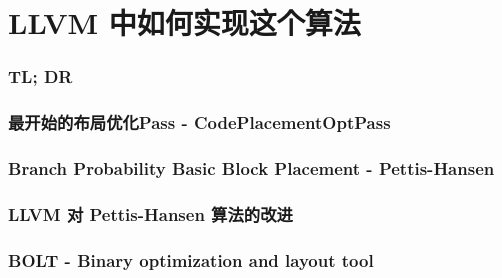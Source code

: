 \section{LLVM 中如何实现这个算法}


\begin{frame}
    \frametitle{TL; DR}
    
\end{frame}

\begin{frame}
    \frametitle{最开始的布局优化Pass - CodePlacementOptPass}
    
\end{frame}


\begin{frame}
    \frametitle{Branch Probability Basic Block Placement - Pettis-Hansen}
    
\end{frame}

\begin{frame}
    \frametitle{LLVM 对 Pettis-Hansen 算法的改进}
    
\end{frame}

\begin{frame}
    \frametitle{BOLT - Binary optimization and layout tool}
    
\end{frame}